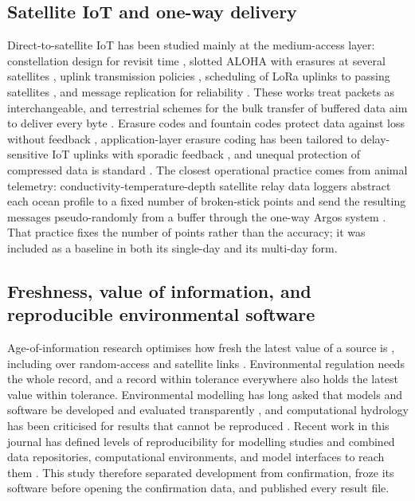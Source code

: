\subsection{Satellite IoT and one-way delivery}
Direct-to-satellite IoT has been studied mainly at the medium-access layer: constellation design for revisit time \citep{capez2022}, slotted ALOHA with erasures at several satellites \citep{tondo2021}, uplink transmission policies \citep{alvarez2022}, scheduling of LoRa uplinks to passing satellites \citep{afhamisis2022}, and message replication for reliability \citep{rathi2025}. These works treat packets as interchangeable, and terrestrial schemes for the bulk transfer of buffered data aim to deliver every byte \citep{abdelfadeel2020}. Erasure codes and fountain codes protect data against loss without feedback \citep{reed1960,luby2002,ho2006}, application-layer erasure coding has been tailored to delay-sensitive IoT uplinks with sporadic feedback \citep{chaubey2022}, and unequal protection of compressed data is standard \citep{albanese1996}. The closest operational practice comes from animal telemetry: conductivity-temperature-depth satellite relay data loggers abstract each ocean profile to a fixed number of broken-stick points and send the resulting messages pseudo-randomly from a buffer through the one-way Argos system \citep{boehme2009,photopoulou2015}. That practice fixes the number of points rather than the accuracy; it was included as a baseline in both its single-day and its multi-day form.

\subsection{Freshness, value of information, and reproducible environmental software}
Age-of-information research optimises how fresh the latest value of a source is \citep{yates2021}, including over random-access and satellite links \citep{chen2021,talli2026,ramachandran2026}. Environmental regulation needs the whole record, and a record within tolerance everywhere also holds the latest value within tolerance. Environmental modelling has long asked that models and software be developed and evaluated transparently \citep{jakeman2006}, and computational hydrology has been criticised for results that cannot be reproduced \citep{hutton2016}. Recent work in this journal has defined levels of reproducibility for modelling studies \citep{essawy2020} and combined data repositories, computational environments, and model interfaces to reach them \citep{choi2021}. This study therefore separated development from confirmation, froze its software before opening the confirmation data, and published every result file.

